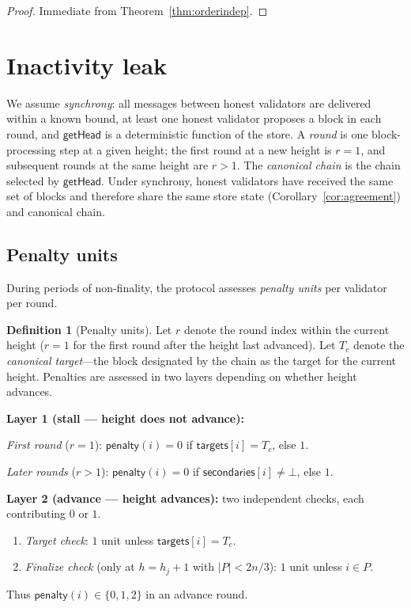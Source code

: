 \ifx\litemode\undefined\documentclass{article}\fi
\theoremstyle{plain}
\theoremstyle{definition}
\newtheorem{definition}[theorem]{Definition}
\theoremstyle{remark}
\begin{document}
\begin{proof}
Immediate from Theorem~\ref{thm:orderindep}.
\end{proof}


\section{Inactivity leak}

We assume \emph{synchrony}: all messages between honest validators are delivered within a known bound, at least one honest validator proposes a block in each round, and $\textsf{getHead}$ is a deterministic function of the store.
A \emph{round} is one block-processing step at a given height; the first round at a new height is $r = 1$, and subsequent rounds at the same height are $r > 1$.
The \emph{canonical chain} is the chain selected by $\textsf{getHead}$.
Under synchrony, honest validators have received the same set of blocks and therefore share the same store state (Corollary~\ref{cor:agreement}) and canonical chain.

\subsection{Penalty units}

During periods of non-finality, the protocol assesses \emph{penalty units} per validator per round.

\begin{definition}[Penalty units]\label{def:penalty}
Let $r$ denote the round index within the current height ($r = 1$ for the first round after the height last advanced).
Let $T_c$ denote the \emph{canonical target}---the block designated by the chain as the target for the current height.
Penalties are assessed in two layers depending on whether height advances.

\medskip\noindent\textbf{Layer 1 (stall --- height does not advance):}

\emph{First round} ($r = 1$): $\mathsf{penalty}(i) = 0$ if $\mathsf{targets}[i] = T_c$, else $1$.

\emph{Later rounds} ($r > 1$): $\mathsf{penalty}(i) = 0$ if $\mathsf{secondaries}[i] \neq \bot$, else $1$.

\medskip\noindent\textbf{Layer 2 (advance --- height advances):}
two independent checks, each contributing $0$ or $1$.
\begin{enumerate}
  \item \emph{Target check}: $1$ unit unless $\mathsf{targets}[i] = T_c$.
  \item \emph{Finalize check} (only at $h = h_j + 1$ with $|P| < 2n/3$): $1$ unit unless $i \in P$.
\end{enumerate}
Thus $\mathsf{penalty}(i) \in \{0, 1, 2\}$ in an advance round.
\end{definition}
\end{document}
